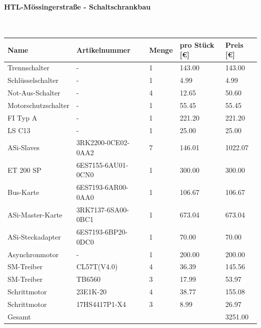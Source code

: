 \paragraph{HTL-Mössingerstraße - Schaltschrankbau}\mbox{}\\
\begin{table}[H]
    \begin{tabular}{lllll}
    Name                & Artikelnummer                          & Menge & pro Stück {[}€{]} & Preis {[}€{]} \\ \hline
    Trennschalter       & -                                     & 1     & 143.00            & 143.00        \\
    Schlüsselschalter   & -                                     & 1     & 4.99              & 4.99          \\
    Not-Aus-Schalter    & -                                     & 4     & 12.65             & 50.60         \\
    Motorschutzschalter & -                                     & 1     & 55.45             & 55.45         \\
    FI Typ A & -                         & 1     & 221.20            & 221.20        \\
    LS C13 & -                             & 1     & 25.00             & 25.00         \\
    ASi-Slaves          & 3RK2200-0CE02-0AA2                   & 7     & 146.01            & 1022.07       \\
    ET 200 SP           & 6ES7155-6AU01-0CN0                   & 1     & 300.00            & 300.00        \\
    Bus-Karte           & 6ES7193-6AR00-0AA0                   & 1     & 106.67            & 106.67        \\
    ASi-Master-Karte    & 3RK7137-6SA00-0BC1                   & 1     & 673.04            & 673.04        \\
    ASi-Steckadapter    & 6ES7193-6BP20-0DC0                   & 1     & 70.00             & 70.00         \\
    Asynchronmotor      & -                                     & 1     & 200.00            & 200.00        \\
    SM-Treiber          & CL57T(V4.0)                          & 4     & 36.39             & 145.56        \\
    SM-Treiber          & TB6560                               & 3     & 17.99             & 53.97         \\
    Schrittmotor        & 23E1K-20                             & 4     & 38.77             & 155.08        \\
    Schrittmotor        & 17HS4417P1-X4                        & 3     & 8.99              & 26.97         \\ \hline
    Gesamt              &                                      &       &                   & 3251.00       
    \end{tabular}
\end{table}
\newpage



